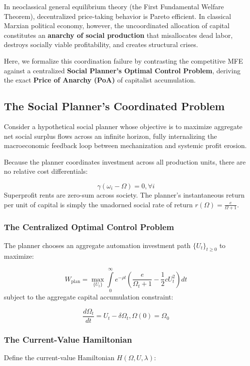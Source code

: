 \documentclass[11pt,letterpaper]{report}
\begin{document}
In neoclassical general equilibrium theory (the First Fundamental Welfare Theorem), decentralized price-taking behavior is Pareto efficient. In classical Marxian political economy, however, the uncoordinated allocation of capital constitutes an \textbf{anarchy of social production} that misallocates dead labor, destroys socially viable profitability, and creates structural crises.

Here, we formalize this coordination failure by contrasting the competitive MFE against a centralized \textbf{Social Planner's Optimal Control Problem}, deriving the exact \textbf{Price of Anarchy (PoA)} of capitalist accumulation.

\subsection{The Social Planner's Coordinated Problem}
Consider a hypothetical social planner whose objective is to maximize aggregate net social surplus flows across an infinite horizon, fully internalizing the macroeconomic feedback loop between mechanization and systemic profit erosion.

Because the planner coordinates investment across all production units, there are no relative cost differentials:

\[
\gamma ({\omega }_{i}-\Omega )=0,\forall i
\]
Superprofit rents are zero-sum across society. The planner's instantaneous return per unit of capital is simply the unadorned social rate of return $r(\Omega )=\frac{e}{\Omega +1}$.

\subsubsection{The Centralized Optimal Control Problem}
The planner chooses an aggregate automation investment path $\{{U}_{t}{\}}_{t\geq 0}$ to maximize:

\[
{W}_{\mathrm{plan}}=\max_{\{{U}_{t}\}}\int\limits_{0}^{\infty }{e}^{-\rho t}\left({\frac{e}{{\Omega }_{t}+1}-\frac{1}{2}c{U}_{t}^{2}}\right)dt
\]
subject to the aggregate capital accumulation constraint:

\[
\frac{d{\Omega }_{t}}{dt}={U}_{t}-\delta {\Omega }_{t},\Omega (0)={\Omega }_{0}
\]
\subsubsection{The Current-Value Hamiltonian}
Define the current-value Hamiltonian $H(\Omega ,U,\lambda )$:
\end{document}
